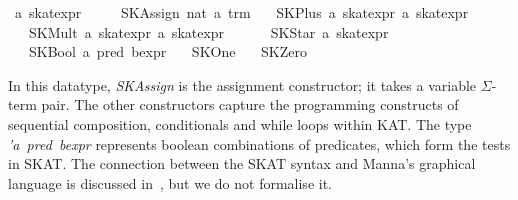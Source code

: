 \documentclass{llncs}
\begin{document}
\begin{isabellebody}
\isanewline
\isamarkuptrue%
\isamarkupfalse%
\ {}a\ skat{}expr\ {}\isanewline
\ \ \ \ SKAssign\ nat\ {}{}a\ trm{}\isanewline
\ \ {}\ SKPlus\ {}{}a\ skat{}expr{}\ {}{}a\ skat{}expr{}\ {}\ {}{}{}\ {}{}{}\isanewline
\ \ {}\ SKMult\ {}{}a\ skat{}expr{}\ {}{}a\ skat{}expr{}\ {}\ {}{}{}\ {}{}{}\isanewline
\ \ {}\ SKStar\ {}{}a\ skat{}expr{}\isanewline
\ \ {}\ SKBool\ {}{}a\ pred\ bexpr{}\isanewline
\ \ {}\ SKOne\isanewline
\ \ {}\ SKZero\isanewline
\end{isabellebody}

\noindent In this datatype, \textit{SKAssign} is the assignment
constructor; it takes a variable $\Sigma$-term pair. The other
constructors capture the programming constructs of sequential
composition, conditionals and while loops within KAT. The type
\textit{'a~pred~bexpr} represents boolean combinations of predicates,
which form the tests in SKAT. The connection between the SKAT syntax
and Manna's graphical language is discussed in~\cite{Angus}, but we do
not formalise it.
\end{document}
